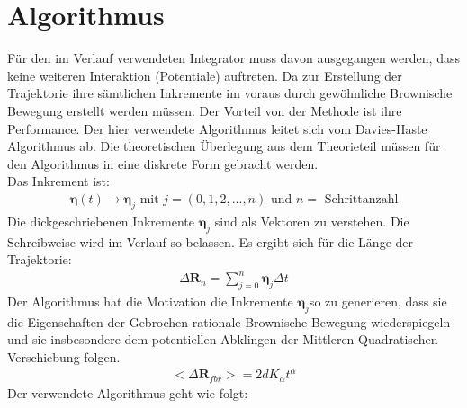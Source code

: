 \documentclass[
  a4paper,BCOR10mm,oneside,
  bibtotoc,idxtotoc,
  headsepline,footsepline,%
  fleqn,openbib
]{scrbook}
\begin{document}
\section{Algorithmus}
Für den im Verlauf verwendeten Integrator muss davon ausgegangen werden, dass keine weiteren Interaktion (Potentiale) auftreten. Da zur Erstellung der Trajektorie ihre sämtlichen Inkremente im voraus durch gewöhnliche Brownische Bewegung erstellt werden müssen. Der Vorteil von der Methode ist ihre Performance. Der hier verwendete Algorithmus leitet sich vom Davies-Haste Algorithmus \cite{Craigmile2003} ab. Die theoretischen Überlegung aus dem Theorieteil müssen für den Algorithmus in eine diskrete Form gebracht werden. \\Das Inkrement ist:
\begin{align}
\boldsymbol{\eta} (t) \longrightarrow \boldsymbol{\eta}_j  \text{  mit  } j=(0,1,2,...,n)  \text{  und  } n= \text{ Schrittanzahl}
\end{align}
Die dickgeschriebenen Inkremente $\boldsymbol{\eta}_j$ sind als Vektoren zu verstehen. Die Schreibweise wird im Verlauf so belassen.
Es ergibt sich für die Länge der Trajektorie:
\begin{align}
 \Delta \boldsymbol{R}_n =  \sum_{j=0}^n \boldsymbol{\eta}_j  \Delta t \label{eq:diskretdeltar}
\end{align}
 Der Algorithmus hat die Motivation die Inkremente $ \boldsymbol{\eta}_j$so zu generieren, dass sie die Eigenschaften der Gebrochen-rationale Brownische Bewegung wiederspiegeln und sie insbesondere dem potentiellen Abklingen der Mittleren Quadratischen Verschiebung folgen.
\begin{align}
< \Delta \boldsymbol{R}_{fbr}>=2dK_{\alpha}t^{\alpha}
\end{align}
Der verwendete Algorithmus geht wie folgt:
 
\end{document}
